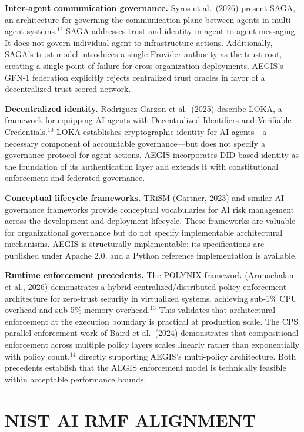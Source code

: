 \documentclass{IEEEcsmag}
\begin{document}
{\bf Inter-agent communication governance.} Syros et al.\ (2026) present SAGA, an architecture for governing the communication plane between agents in multi-agent systems.$^{12}$ SAGA addresses trust and identity in agent-to-agent messaging. It does not govern individual agent-to-infrastructure actions. Additionally, SAGA's trust model introduces a single Provider authority as the trust root, creating a single point of failure for cross-organization deployments. AEGIS's GFN-1 federation explicitly rejects centralized trust oracles in favor of a decentralized trust-scored network.

{\bf Decentralized identity.} Rodriguez Garzon et al.\ (2025) describe LOKA, a framework for equipping AI agents with Decentralized Identifiers and Verifiable Credentials.$^{10}$ LOKA establishes cryptographic identity for AI agents---a necessary component of accountable governance---but does not specify a governance protocol for agent actions. AEGIS incorporates DID-based identity as the foundation of its authentication layer and extends it with constitutional enforcement and federated governance.

{\bf Conceptual lifecycle frameworks.} TRiSM (Gartner, 2023) and similar AI governance frameworks provide conceptual vocabularies for AI risk management across the development and deployment lifecycle. These frameworks are valuable for organizational governance but do not specify implementable architectural mechanisms. AEGIS is structurally implementable: its specifications are published under Apache 2.0, and a Python reference implementation is available.

{\bf Runtime enforcement precedents.} The POLYNIX framework (Arunachalam et al., 2026) demonstrates a hybrid centralized/distributed policy enforcement architecture for zero-trust security in virtualized systems, achieving sub-1\% CPU overhead and sub-5\% memory overhead.$^{13}$ This validates that architectural enforcement at the execution boundary is practical at production scale. The CPS parallel enforcement work of Baird et al.\ (2024) demonstrates that compositional enforcement across multiple policy layers scales linearly rather than exponentially with policy count,$^{14}$ directly supporting AEGIS's multi-policy architecture. Both precedents establish that the AEGIS enforcement model is technically feasible within acceptable performance bounds.

\section{NIST AI RMF ALIGNMENT}
\end{document}
